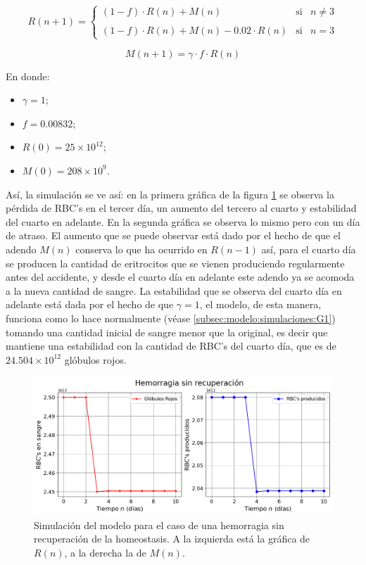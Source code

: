 $$R(n+1)= \left\{ \begin{array}{lcc} (1-f)\cdot R(n)+M(n) & \textrm{si} & n \neq 3 \\ \\ (1-f)\cdot R(n)+M(n)-0.02\cdot R(n) & \textrm{si} & n = 3\end{array} \right.$$

$$M(n+1)=\gamma \cdot f \cdot R(n)$$

En donde:
\begin{itemize}
    \item $\gamma=1$;
    \item $f=0.00832$;
    \item $R(0) = 25\times 10^{12};$
    \item $M(0) = 208 \times 10^{9}.$
\end{itemize}

Así, la simulación se ve así: en la primera gráfica de la figura \ref{sec:variaciones:fig:HemoLeveG1} se observa la pérdida de RBC's en el tercer día, un aumento del tercero al cuarto y estabilidad del cuarto en adelante. En la segunda gráfica se observa lo mismo pero con un día de atraso. El aumento que se puede observar está dado por el hecho de que el adendo $M(n)$ conserva lo que ha ocurrido en $R(n-1)$ así, para el cuarto día se producen la cantidad de eritrocitos que se vienen produciendo regularmente antes del accidente, y desde el cuarto día en adelante este adendo ya se acomoda a la nueva cantidad de sangre. La estabilidad que se observa del cuarto día en adelante está dada por el hecho de que $\gamma = 1$, el modelo, de esta manera, funciona como lo hace normalmente (véase \ref{subsec:modelo:simulaciones:G1}) tomando una cantidad inicial de sangre menor que la original, es decir que mantiene una estabilidad con la cantidad de RBC's del cuarto día, que es de $24.504\times 10^{12}$ glóbulos rojos. 

\begin{figure}[H]
    \centering
    \captionsetup{justification=centering}
    \includegraphics[scale=0.534]{figures/HemoLeveG1.png}
    \caption{Simulación del modelo para el caso de una hemorragia sin recuperación de la homeostasis. A la izquierda está la gráfica de $R(n)$, a la derecha la de $M(n)$.}
    \label{sec:variaciones:fig:HemoLeveG1}
\end{figure}

